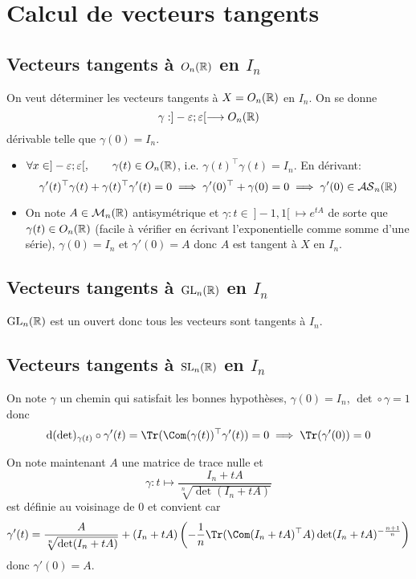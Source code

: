 \section{Calcul de vecteurs tangents}

\subsection{Vecteurs tangents à $O_n(\mathbb R)$ en $I_n$}

On veut déterminer les vecteurs tangents à $X=O_n(\mathbb R)$ en $I_n$. On se donne \[
    \gamma: ]-\varepsilon; \varepsilon[ \longrightarrow O_n(\mathbb R)
\]
dérivable telle que $\gamma (0)=I_n$. \begin{itemize}
    \item $\forall x\in ]-\varepsilon; \varepsilon[, \qquad \gamma(t)\in O_n(\mathbb R)$, i.e. $\gamma(t)^{\top}\gamma(t)=I_n$. En dérivant: \[
            \gamma'(t)^\top\gamma(t)+\gamma(t)^\top\gamma'(t)=0\implies \gamma'(0)^\top+\gamma(0)=0 \implies \gamma'(0)\in \mathcal{AS}_n(\mathbb R)
        \]
    \item On note $A\in\mathcal M_n(\mathbb R)$ antisymétrique et $\gamma:t\in ~]-1, 1[~\longmapsto e^{tA}$ de sorte que $\gamma(t)\in O_n(\mathbb R)$ (facile à vérifier en écrivant l'exponentielle comme somme d'une série), $\gamma(0)=I_n$ et $\gamma'(0)=A$ donc $A$ est tangent à $X$ en $I_n$.
\end{itemize}

\subsection{Vecteurs tangents à $\mathrm{GL}_n(\mathbb R)$ en $I_n$}

$\mathrm{GL}_n(\mathbb R)$ est un ouvert donc tous les vecteurs sont tangents à $I_n$.

\subsection{Vecteurs tangents à $\mathrm{SL}_n(\mathbb R)$ en $I_n$}

On note $\gamma$ un chemin qui satisfait les bonnes hypothèses, $\gamma(0)=I_n$, $\det \circ \gamma =1$ donc \[
    \diff (\det)_{\gamma(t)}\circ \gamma'(t)=\Tr(\Com(\gamma(t))^\top \gamma'(t))=0 \implies \Tr(\gamma'(0))=0
\]

On note maintenant $A$ une matrice de trace nulle et \[
    \gamma: t\longmapsto \frac{I_n+tA}{\sqrt[n]{\det(I_n+tA)}}
\]
est définie au voisinage de $0$ et convient car \[
    \gamma'(t)=\frac{A}{\sqrt[n]{\det(I_n+tA)}}+(I_n+tA) \left( - \frac{1}{n} \Tr(\Com(I_n+tA)^\top A)\det(I_n+tA)^{- \frac{n+1}{n} } \right)
\]
donc $\gamma'(0)=A$.

